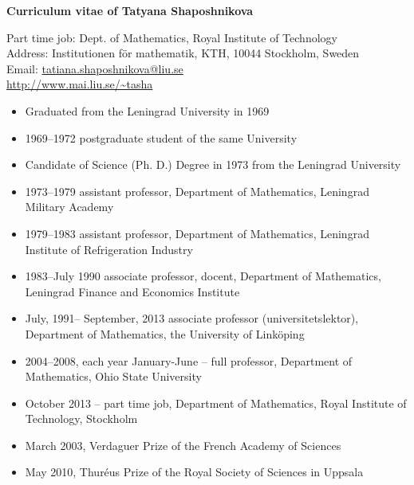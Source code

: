 \documentclass{article}
\begin{document}
\parindent=0pt
\addtolength{\parskip}{4pt}
\addtolength{\textwidth}{10em}
\addtolength{\textheight}{12em}
\def\tc{\mathaccent"7017}


\centerline{\large{\bf Curriculum vitae of Tatyana Shaposhnikova}}

\noindent
Part time job: Dept. of Mathematics, Royal Institute of Technology\\
Address: Institutionen f\"or mathematik, KTH, 10044 Stockholm, Sweden\\
Email: \href{mailto:tatiana.shaposhnikova@liu.se}{tatiana.shaposhnikova@liu.se}\\
\url{http://www.mai.liu.se/~tasha}


\begin{itemize}
         \item Graduated from the Leningrad University in 1969
         \item 1969--1972 postgraduate student of the same University
         \item Candidate of Science (Ph. D.) Degree in 1973 from the 
Leningrad University
\end{itemize}

\begin{itemize}
         \item 1973--1979  assistant professor, Department of 
Mathematics, Leningrad
          Military Academy
         \item 1979--1983  assistant professor, Department of 
Mathematics, Leningrad
          Institute of Refrigeration Industry
          \item 1983--July 1990  associate professor, docent, 
Department of Mathematics, Leningrad Finance
         and Economics Institute
          \item  July, 1991-- September, 2013   associate professor 
(universitetslektor), Department of Mathematics, the
         University of Link\"oping
         \item 2004--2008, each year January-June -- full professor, Department of Mathematics, Ohio State University
        \item October 2013 -- part time job,  Department of Mathematics, Royal Institute of Technology, Stockholm
        
\end{itemize}

\begin{itemize}
         \item March 2003, Verdaguer Prize of the French Academy of Sciences
         \item May 2010, Thur\'eus Prize of the Royal Society of Sciences in Uppsala
\end{itemize}
\end{document}
